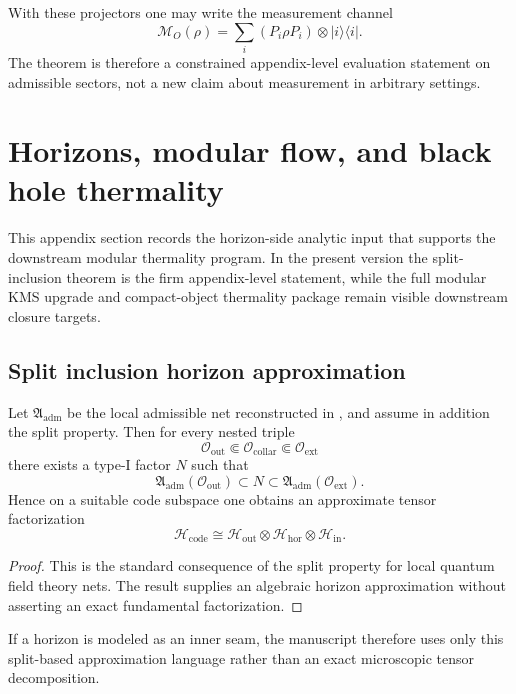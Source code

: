 With these projectors one may write the measurement channel
\[
\mathcal M_O(\rho)=\sum_i(P_i\rho P_i)\otimes |i\rangle\langle i|.
\]
The theorem is therefore a constrained appendix-level evaluation statement on admissible sectors,
not a new claim about measurement in arbitrary settings.

\section{Horizons, modular flow, and black hole thermality}
\label{app:horizons}

This appendix section records the horizon-side analytic input that supports the downstream modular
thermality program. In the present version the split-inclusion theorem is the firm appendix-level
statement, while the full modular KMS upgrade and compact-object thermality package remain visible
downstream closure targets.

\subsection{Split inclusion horizon approximation}

\begin{theorem}
\label{thm:horizon-split-inclusion}
Let $\mathfrak A_{\mathrm{adm}}$ be the local admissible net reconstructed in
, and assume in addition the split property. Then for
every nested triple
\[
\mathcal O_{\mathrm{out}}\Subset \mathcal O_{\mathrm{collar}}\Subset \mathcal O_{\mathrm{ext}}
\]
there exists a type-I factor $N$ such that
\[
\mathfrak A_{\mathrm{adm}}(\mathcal O_{\mathrm{out}})
\subset
N
\subset
\mathfrak A_{\mathrm{adm}}(\mathcal O_{\mathrm{ext}}).
\]
Hence on a suitable code subspace one obtains an approximate tensor factorization
\[
\mathcal H_{\mathrm{code}}
\cong
\mathcal H_{\mathrm{out}}\otimes\mathcal H_{\mathrm{hor}}\otimes\mathcal H_{\mathrm{in}}.
\]
\end{theorem}

\begin{proof}
This is the standard consequence of the split property for local quantum field theory nets. The
result supplies an algebraic horizon approximation without asserting an exact fundamental
factorization.
\end{proof}

If a horizon is modeled as an inner seam, the manuscript therefore uses only this split-based
approximation language rather than an exact microscopic tensor decomposition.

